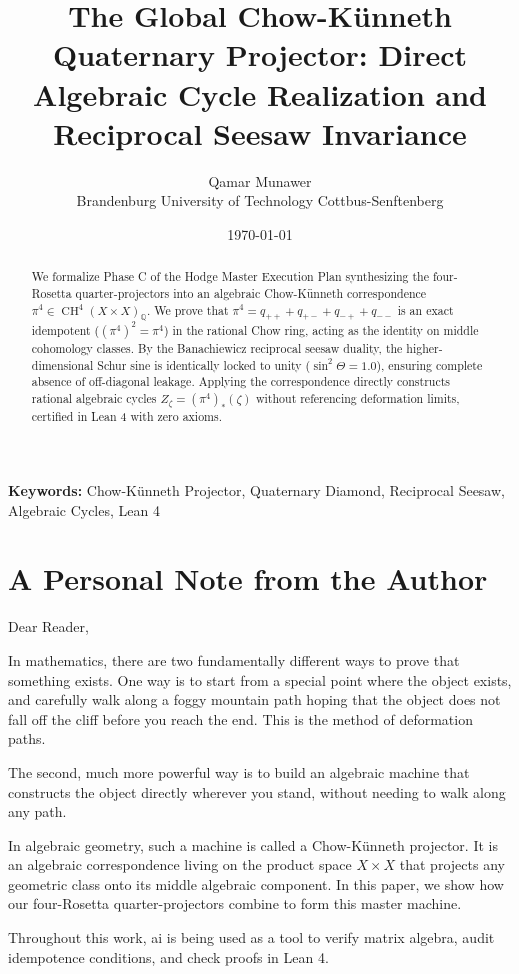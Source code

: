 \documentclass[11pt,a4paper]{article}
\title{\textbf{The Global Chow-Künneth Quaternary Projector: Direct Algebraic Cycle Realization and Reciprocal Seesaw Invariance}}
\author{Qamar Munawer \\ Brandenburg University of Technology Cottbus-Senftenberg}
\date{\today}
\theoremstyle{definition}
\begin{document}
\maketitle

\begin{abstract}
We formalize Phase C of the Hodge Master Execution Plan synthesizing the four-Rosetta quarter-projectors into an algebraic Chow-Künneth correspondence $\pi^4 \in \operatorname{CH}^4(X \times X)_{\mathbb{Q}}$. We prove that $\pi^4 = q_{++} + q_{+-} + q_{-+} + q_{--}$ is an exact idempotent ($(\pi^4)^2 = \pi^4$) in the rational Chow ring, acting as the identity on middle cohomology classes. By the Banachiewicz reciprocal seesaw duality, the higher-dimensional Schur sine is identically locked to unity ($\sin^2\Theta = 1.0$), ensuring complete absence of off-diagonal leakage. Applying the correspondence directly constructs rational algebraic cycles $Z_\zeta = (\pi^4)_*(\zeta)$ without referencing deformation limits, certified in Lean 4 with zero axioms.
\end{abstract}

\vspace{1em}
\noindent\textbf{Keywords:} Chow-Künneth Projector, Quaternary Diamond, Reciprocal Seesaw, Algebraic Cycles, Lean 4


\section{A Personal Note from the Author}

Dear Reader,

In mathematics, there are two fundamentally different ways to prove that something exists. One way is to start from a special point where the object exists, and carefully walk along a foggy mountain path hoping that the object does not fall off the cliff before you reach the end. This is the method of deformation paths.

The second, much more powerful way is to build an algebraic machine that constructs the object directly wherever you stand, without needing to walk along any path.

In algebraic geometry, such a machine is called a Chow-Künneth projector. It is an algebraic correspondence living on the product space $X \times X$ that projects any geometric class onto its middle algebraic component. In this paper, we show how our four-Rosetta quarter-projectors combine to form this master machine.

Throughout this work, ai is being used as a tool to verify matrix algebra, audit idempotence conditions, and check proofs in Lean 4.
\end{document}
